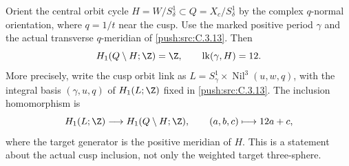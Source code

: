 \begin{proposition}\label{push:src:C.3.16}
Orient the central orbit cycle $H=W/S^1_\delta\subset Q=X_c/S^1_\delta$
by the complex $q$-normal orientation, where $q=1/t$ near the cusp.
Use the marked positive period $\gamma$ and the actual transverse
$q$-meridian of \ref{push:src:C.3.13}. Then
\[
 H_1(Q\setminus H;\Z)=\Z,
 \qquad \operatorname{lk}(\gamma,H)=12.
\]
More precisely, write the cusp orbit link as
$L=S^1_\gamma\times\operatorname{Nil}^3(u,w,q)$, with the integral
basis $(\gamma,u,q)$ of $H_1(L;\Z)$ fixed in \ref{push:src:C.3.13}. The inclusion
homomorphism is
\[
 H_1(L;\Z)\longrightarrow H_1(Q\setminus H;\Z),
 \qquad (a,b,c)\longmapsto 12a+c,
\]
where the target generator is the positive meridian of $H$.
This is a statement about the actual cusp inclusion, not only the
weighted target three-sphere.
\end{proposition}
